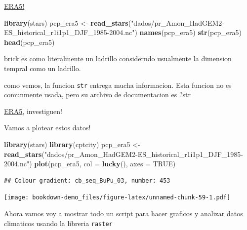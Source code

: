 \documentclass[]{book}
\newenvironment{Shaded}{\begin{snugshade}}{\end{snugshade}}
\newcommand{\DataTypeTok}[1]{\textcolor[rgb]{0.13,0.29,0.53}{#1}}
\newcommand{\KeywordTok}[1]{\textcolor[rgb]{0.13,0.29,0.53}{\textbf{#1}}}
\newcommand{\NormalTok}[1]{#1}
\newcommand{\OtherTok}[1]{\textcolor[rgb]{0.56,0.35,0.01}{#1}}
\newcommand{\StringTok}[1]{\textcolor[rgb]{0.31,0.60,0.02}{#1}}
\begin{document}
\href{https://www.ecmwf.int/en/forecasts/datasets/reanalysis-datasets/era5}{ERA5!}

\begin{Shaded}
\begin{Highlighting}[]
\KeywordTok{library}\NormalTok{(stars)}
\NormalTok{pcp_era5 <-}\StringTok{ }\KeywordTok{read_stars}\NormalTok{(}\StringTok{"dados/pr_Amon_HadGEM2-ES_historical_r1i1p1_DJF_1985-2004.nc"}\NormalTok{)}
\KeywordTok{names}\NormalTok{(pcp_era5)}
\KeywordTok{str}\NormalTok{(pcp_era5)}
\KeywordTok{head}\NormalTok{(pcp_era5)}
\end{Highlighting}
\end{Shaded}

brick es como literalmente un ladrillo considerndo usualmente la dimension tempral como un ladrillo.

como vemos, la funcion \texttt{str} entrega mucha informacion. Esta funcion no es comunmente usada, pero su archivo de documentacion es ?str

\href{https://www.ecmwf.int/en/forecasts/datasets/reanalysis-datasets/era5}{ERA5}, investiguen!

Vamos a plotear estos datos!

\begin{Shaded}
\begin{Highlighting}[]
\KeywordTok{library}\NormalTok{(stars)}
\KeywordTok{library}\NormalTok{(cptcity)}
\NormalTok{pcp_era5 <-}\StringTok{ }\KeywordTok{read_stars}\NormalTok{(}\StringTok{"dados/pr_Amon_HadGEM2-ES_historical_r1i1p1_DJF_1985-2004.nc"}\NormalTok{)}
\KeywordTok{plot}\NormalTok{(pcp_era5,}
    \DataTypeTok{col =} \KeywordTok{lucky}\NormalTok{(),}
     \DataTypeTok{axes =} \OtherTok{TRUE}\NormalTok{)}
\end{Highlighting}
\end{Shaded}

\begin{verbatim}
## Colour gradient: cb_seq_BuPu_03, number: 453
\end{verbatim}

\texttt{[image: bookdown-demo\_files/figure-latex/unnamed-chunk-59-1.pdf]}

Ahora vamos voy a mostrar todo un script para hacer graficos y analizar datos climaticos usando la libreria \texttt{raster}
\end{document}
